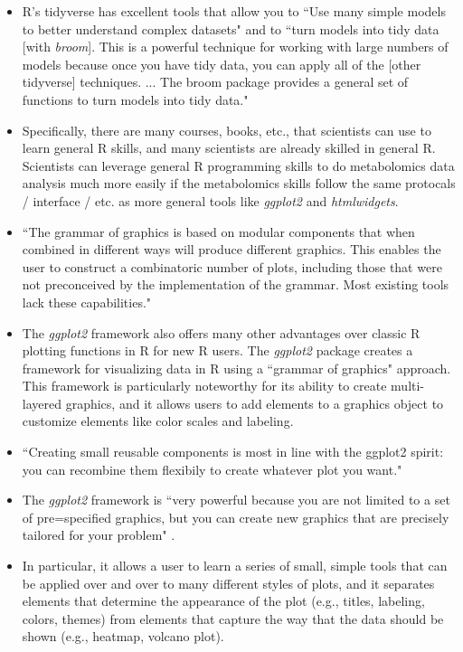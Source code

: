 \documentclass[pdftex,english,11pt,parskip=half]{scrartcl}
\begin{document}
\begin{itemize}
\item R's tidyverse has excellent tools that allow you to ``Use many simple models to better understand complex datasets" and to ``turn models into tidy data [with \textit{broom}]. This is a powerful technique for working with large numbers of models because once you have tidy data, you can apply all of the [other tidyverse] techniques. ... The broom package provides a general set of functions to turn models into tidy data." \cite{grolemund2016r} 
\item Specifically, there are many courses, books, etc., that scientists can use to learn general R skills, and many scientists are already skilled in general R. Scientists can leverage general R programming skills to do metabolomics data analysis much more easily if the metabolomics skills follow the same protocals / interface / etc. as more general tools like \textit{ggplot2} and \textit{htmlwidgets}. 
\item ``The grammar of graphics is based on modular components that when combined in different ways will produce different graphics. This enables the user to construct a combinatoric number of plots, including those that were not preconceived by the implementation of the grammar. Most existing tools lack these capabilities." \cite{yin2012ggbio} \item The \textit{ggplot2} framework also offers many other advantages over classic R plotting functions in R for new R users. The \textit{ggplot2} package creates a framework for visualizing data in R using a ``grammar of graphics" approach. This framework is particularly noteworthy for its ability to create multi-layered graphics, and it allows users to add elements to a graphics object to customize elements like color scales and labeling. 
\item ``Creating small reusable components is most in line with the ggplot2 spirit: you can recombine them flexibily to create whatever plot you want." \cite{wickham2016ggplot2} \item The \textit{ggplot2} framework is ``very powerful because you are not limited to a set of pre=specified graphics, but you can create new graphics that are precisely tailored for your problem" \cite{wickham2016ggplot2}. 
\item In particular, it allows a user to learn a series of small, simple tools that can be applied over and over to many different styles of plots, and it separates elements that determine the appearance of the plot (e.g., titles, labeling, colors, themes) from elements that capture the way that the data should be shown (e.g., heatmap, volcano plot). 

\end{itemize}
\end{document}
